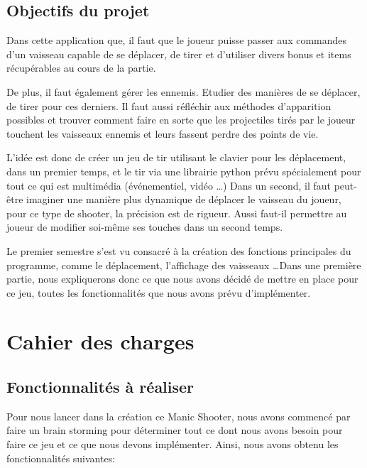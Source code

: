 \documentclass[a4paper, 12pt]{report}
\begin{document}
    \section{Objectifs du projet}
Dans cette application que, il faut que le joueur
puisse passer aux commandes d'un vaisseau capable de se déplacer, de tirer et
d'utiliser divers bonus et items récupérables au cours de la partie. \newline

\noindent De plus, il faut également gérer les ennemis. Etudier des manières de
se déplacer, de tirer pour ces derniers. Il faut aussi réfléchir aux méthodes
d'apparition possibles et trouver comment faire en sorte que les projectiles
tirés par le joueur touchent les vaisseaux ennemis et leurs fassent perdre des
points de vie.\newline

\noindent L'idée est donc de créer un jeu de tir utilisant le clavier pour les
déplacement, dans un premier temps, et le tir via une librairie python prévu
spécialement pour  tout ce qui est multimédia (événementiel, vidéo \ldots) Dans
un second, il faut peut-être imaginer une manière plus dynamique de déplacer
le vaisseau du joueur, pour ce type de shooter, la précision est de rigueur.
Aussi faut-il permettre au joueur de modifier soi-même ses touches dans un
second temps. \newline

\noindent Le premier semestre s'est vu consacré à la création des fonctions
principales du programme, comme le déplacement, l'affichage des vaisseaux
\ldots Dans une première partie, nous expliquerons donc ce que nous avons
décidé de mettre en place pour ce jeu, toutes les fonctionnalités que nous
avons prévu
d'implémenter.

\chapter{Cahier des charges}
    \section{Fonctionnalités à réaliser}
Pour nous lancer dans la création ce Manic Shooter, nous avons commencé par
faire un brain storming pour déterminer tout ce dont nous avons besoin pour
faire ce jeu et ce que nous devons implémenter. Ainsi, nous avons obtenu les
fonctionnalités suivantes: \newline
\end{document}
